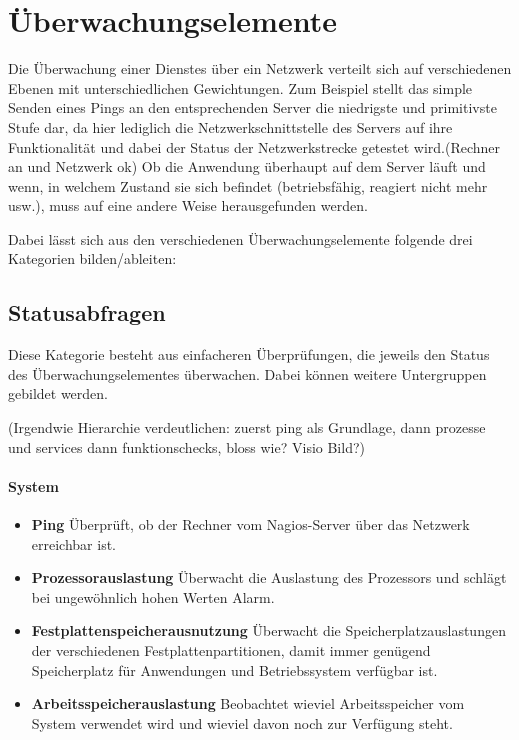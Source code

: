 \section{Überwachungselemente}
Die Überwachung einer Dienstes über ein Netzwerk verteilt sich auf verschiedenen Ebenen mit unterschiedlichen Gewichtungen.
Zum Beispiel stellt das simple Senden eines Pings an den entsprechenden Server die niedrigste und primitivste Stufe dar, da hier lediglich die Netzwerkschnittstelle des Servers auf ihre Funktionalität und dabei der Status der Netzwerkstrecke getestet wird.(Rechner an und Netzwerk ok)
Ob die Anwendung überhaupt auf dem Server läuft und wenn, in welchem Zustand sie sich befindet (betriebsfähig, reagiert nicht mehr usw.), muss auf eine andere Weise herausgefunden werden.

Dabei lässt sich aus den verschiedenen Überwachungselemente folgende drei Kategorien bilden/ableiten:

\subsection{Statusabfragen}
\label{syschecks}
Diese Kategorie besteht aus einfacheren Überprüfungen, die jeweils den Status des Überwachungselementes überwachen.
Dabei können weitere Untergruppen gebildet werden.

(Irgendwie Hierarchie verdeutlichen: zuerst ping als Grundlage, dann prozesse und services dann funktionschecks, bloss wie? Visio Bild?)

\paragraph{System}
\begin{itemize}
\item \textbf{Ping} Überprüft, ob der Rechner vom Nagios-Server über das Netzwerk erreichbar ist.
\item \textbf{Prozessorauslastung} Überwacht die Auslastung des Prozessors und schlägt bei ungewöhnlich hohen Werten Alarm.
\item \textbf{Festplattenspeicherausnutzung} Überwacht die Speicherplatzauslastungen der verschiedenen Festplattenpartitionen, damit immer genügend Speicherplatz für Anwendungen und Betriebssystem verfügbar ist.
\item \textbf{Arbeitsspeicherauslastung} Beobachtet wieviel Arbeitsspeicher vom System verwendet wird und wieviel davon noch zur Verfügung steht.
\end{itemize}

